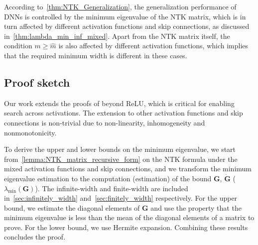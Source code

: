 \documentclass[nohyperref]{article}
\theoremstyle{plain}
\theoremstyle{definition}
\theoremstyle{remark}
\begin{document}
According to~\cref{thm:NTK_Generalization}, the generalization performance of DNNs is controlled by the minimum eigenvalue of the NTK matrix, which is in turn affected by different activation functions and skip connections, as discussed in~\cref{thm:lambda_min_inf_mixed}. Apart from the NTK matrix itself, the condition $m \geq \hat{m}$ is also affected by different activation functions, which implies that the required minimum width is different in these cases.





\subsection{Proof sketch}

Our work extends the proofs of \citet{NEURIPS2020_8abfe8ac,cao2019generalization} beyond ReLU, which is critical for enabling search across activations. 
The extension to other activation functions and skip connections is non-trivial due to non-linearity, inhomogeneity and nonmonotonicity.

To derive the upper and lower bounds on the minimum eigenvalue, we start from~\cref{lemma:NTK_matrix_recursive_form} on the NTK formula under the mixed activation functions and skip connections, and we transform the minimum eigenvalue estimation to the computation (estimation) of the bound $\bm G$, $\dot{\bm G}$ ($\lambda_{\min}(\bm G)$). The infinite-width and finite-width are included in~\cref{sec:infinitely_width} and~\ref{sec:finitely_width} respectively.
For the upper bound, we estimate the diagonal elements of $\bm G$ and use the property that the minimum eigenvalue is less than the mean of the diagonal elements of a matrix to prove.
For the lower bound, we use Hermite expansion. Combining these results concludes the proof.
\end{document}
